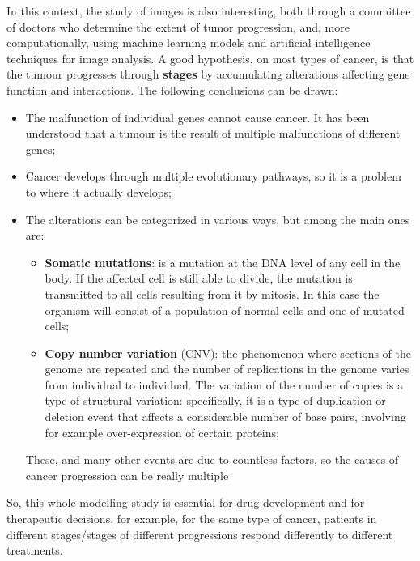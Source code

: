 In this context, the study of images is also interesting, both through a committee of doctors
who determine the extent of tumor progression, and, more computationally, using machine learning
models and artificial intelligence techniques for image analysis. A good hypothesis, on most
types of cancer, is that the tumour progresses through \textbf{stages} by accumulating
alterations affecting gene function and interactions. The following conclusions can be drawn:
\begin{itemize}
    \item The malfunction of individual genes cannot cause cancer. It has been understood that
          a tumour is the result of multiple malfunctions of different genes;
    \item Cancer develops through multiple evolutionary pathways, so it is a problem to
          where it actually develops;
    \item The alterations can be categorized in various ways, but among the main ones are:
          \begin{itemize}
              \item \textbf{Somatic mutations}: is a mutation at the DNA level of any cell in
                    the body. If the affected cell is still able to divide, the mutation is
                    transmitted to all cells resulting from it by mitosis. In this case the
                    organism will consist of a population of normal cells and one of mutated cells;
              \item \textbf{Copy number variation} (CNV): the phenomenon where sections of the
                    genome are repeated and the number of replications in the genome varies from
                    individual to individual. The variation of the number of copies is a type of
                    structural variation: specifically, it is a type of duplication or deletion
                    event that affects a considerable number of base pairs, involving for example over-expression of certain proteins;
          \end{itemize}
          These, and many other events are due to countless factors, so the causes of cancer
          progression can be really multiple
\end{itemize}

So, this whole modelling study is essential for drug development and for therapeutic decisions,
for example, for the same type of cancer, patients in different stages/stages of different
progressions respond differently to different treatments.

